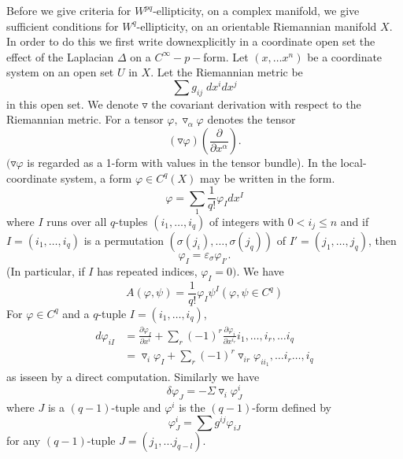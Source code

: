 \begin{theorem}
  Before we give criteria for $W^{pq}$-ellipticity, on a complex
  manifold, we give sufficient conditions for 
  $W^q$-ellipticity, on an orientable Riemannian manifold $X$. In order
  to do this we first write  down\pageoriginale explicitly in a
  coordinate open set the effect of the Laplacian $\Delta$ on   
  a $C^{\infty}-p-$form. Let $(x, \ldots x^n)$ be a coordinate system
  on an open set $U$ in $X$. Let the Riemannian metric be
  $$ 
  \sum g_{ij}\; dx^i dx^j
  $$
  in this open set. We denote $\triangledown$  the covariant
  derivation with respect to the Riemannian metric. For a tensor
  $\varphi,\triangledown_{\alpha}\varphi$ denotes the tensor
  $$ 
  (\triangledown \varphi)(\frac{\partial}{\partial x^{\alpha}}) .
  $$
  $(\triangledown \varphi$ is regarded  as a 1-form with values in the
  tensor bundle). In the local-coordinate system,  
  a form $\varphi \in C^q(X)$ may be written in the form. 
  $$ 
  \varphi=\underset{1}\sum \frac{1}{q!} \varphi_I dx^I
  $$
  where $I$ runs over all $q$-tuples $(i_1,\dots, i_q)$ of integers with
  $0<i_j \leqslant n$ and  if $I=(i_1,\dots,i_q)$ is 
  a permutation $(\sigma(j_i),\ldots, \sigma(j_q))$ of $I'=(j_1,\dots,
  j_q)$, then 
  $$ 
  \varphi_I=\varepsilon_{\sigma} \varphi_{I'}.
  $$
  (In particular, if $I$ has repeated indices, $\varphi_I=0)$. We have 
  $$ 
  A (\varphi, \psi)=\frac{1}{q!} \varphi _I \psi^I (\varphi, \psi \in 
  C^q)
  $$
  For $\varphi \in C^q $ and a $q$-tuple $I =(i_1,\dots,i_q)$,
  \begin{align*}
      d \varphi _{iI} & =\frac{\partial \varphi _I} {\partial x^i}
      + \sum\limits_r  (-1)^r \frac{\partial \varphi_{i}}{\partial
        x^{i_r}} i_1, \ldots, i_r,\ldots i_q\\ 
      &=\triangledown_{i} \varphi_{I}  + \sum\limits_r (-1)^r
      \triangledown_{ir} \varphi_{ii_1},\ldots i_r \ldots ,i_q
      \tag{2.1}\label{eq2.1} 
  \end{align*}
  as is\pageoriginale seen by a direct computation. Similarly we have  
  \begin{equation*}
    \delta \varphi_J=-\Sigma  \triangledown_i \varphi^i_J
    \tag{2.2}\label{eq2.2}  
  \end{equation*}
  where $J$ is a $(q-1)$-tuple and $\varphi^i$ is the $(q-1)$-form defined by   
  $$
  \varphi^i_J= \sum g^{ij} \varphi_{iJ} 
  $$
  for any $(q-1)$-tuple $J=(j_1,... j_{q-l})$.


\end{theorem}
